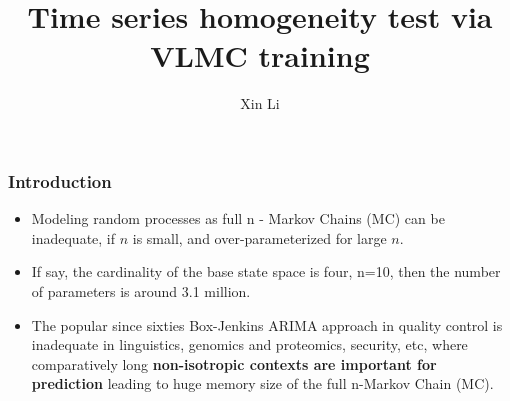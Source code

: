 \documentclass{beamer}
\title[Homogeneity test via VLMC training]{Time series homogeneity test via VLMC training} %
\author{Xin Li} %
\institute[Northeastern University] %
{
Northeastern University \\ %
\medskip
\textit{} %
}
\date{} %
\begin{document}
\begin{frame}
\titlepage %
\end{frame}

\begin{frame}
\frametitle{Introduction} %

\begin{itemize}
\item Modeling random processes
as full n - Markov Chains (MC)  can be inadequate, if $n$ is small, and over-parameterized
for large $n$.
\item If say, the cardinality of the base state space
is four, n=10, then the number of parameters is around 3.1 million.
\item The
popular since sixties Box-Jenkins ARIMA approach in quality control
is inadequate in
linguistics, genomics and proteomics, security, etc, where
comparatively long {\bf non-isotropic contexts are important for prediction} leading to
huge memory size of the full n-Markov Chain (MC).

\end{itemize}

\tableofcontents %
\end{frame}
\end{document}
